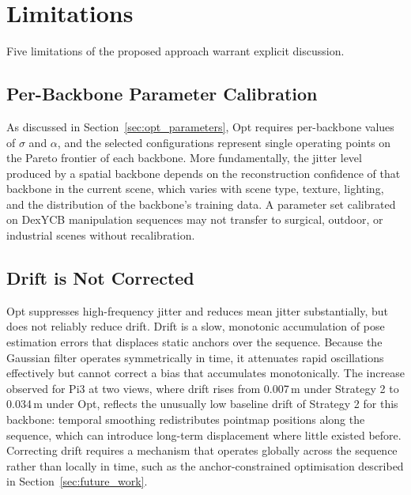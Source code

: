 \section{Limitations}
\label{sec:limitations}

Five limitations of the proposed approach warrant explicit discussion.

\subsection{Per-Backbone Parameter Calibration}
As discussed in Section~\ref{sec:opt_parameters}, Opt requires per-backbone
values of $\sigma$ and $\alpha$, and the selected configurations represent
single operating points on the Pareto frontier of each backbone. More
fundamentally, the jitter level produced by a spatial backbone depends on the
reconstruction confidence of that backbone in the current scene, which varies
with scene type, texture, lighting, and the distribution of the backbone's
training data. A parameter set calibrated on DexYCB manipulation sequences
may not transfer to surgical, outdoor, or industrial scenes without
recalibration.

\subsection{Drift is Not Corrected}
Opt suppresses high-frequency jitter and reduces mean jitter substantially, but
does not reliably reduce drift. Drift is a slow, monotonic accumulation of pose
estimation errors that displaces static anchors over the sequence. Because the
Gaussian filter operates symmetrically in time, it attenuates rapid oscillations
effectively but cannot correct a bias that accumulates monotonically. The
increase observed for Pi3 at two views, where drift rises from 0.007\,m under
Strategy 2 to 0.034\,m under Opt, reflects the unusually low baseline drift of
Strategy 2 for this backbone: temporal smoothing redistributes pointmap positions
along the sequence, which can introduce long-term displacement where little
existed before. Correcting drift requires a mechanism that operates globally
across the sequence rather than locally in time, such as the anchor-constrained
optimisation described in Section~\ref{sec:future_work}.

